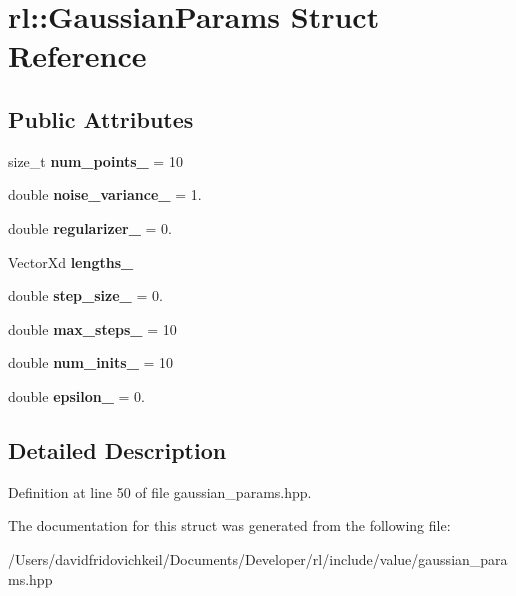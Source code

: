 \hypertarget{structrl_1_1_gaussian_params}{}\section{rl\+:\+:Gaussian\+Params Struct Reference}
\label{structrl_1_1_gaussian_params}
\subsection*{Public Attributes}
\begin{DoxyCompactItemize}
\item 
\hypertarget{structrl_1_1_gaussian_params_a76e6009e1a4541999ce182f81cec5c3f}{}\label{structrl_1_1_gaussian_params_a76e6009e1a4541999ce182f81cec5c3f} 
size\+\_\+t {\bfseries num\+\_\+points\+\_\+} = 10
\item 
\hypertarget{structrl_1_1_gaussian_params_af463006933f852898d53d96886379873}{}\label{structrl_1_1_gaussian_params_af463006933f852898d53d96886379873} 
double {\bfseries noise\+\_\+variance\+\_\+} = 1.
\item 
\hypertarget{structrl_1_1_gaussian_params_a6815c97c112e682e099f75cf800c0b7f}{}\label{structrl_1_1_gaussian_params_a6815c97c112e682e099f75cf800c0b7f} 
double {\bfseries regularizer\+\_\+} = 0.
\item 
\hypertarget{structrl_1_1_gaussian_params_a7940767f6527710ae24cf5b5a7126547}{}\label{structrl_1_1_gaussian_params_a7940767f6527710ae24cf5b5a7126547} 
Vector\+Xd {\bfseries lengths\+\_\+}
\item 
\hypertarget{structrl_1_1_gaussian_params_a4eb755f150de20187dc08b382d38e4a6}{}\label{structrl_1_1_gaussian_params_a4eb755f150de20187dc08b382d38e4a6} 
double {\bfseries step\+\_\+size\+\_\+} = 0.
\item 
\hypertarget{structrl_1_1_gaussian_params_a5132c101f5fc6bf991bdf9a70d6e9e21}{}\label{structrl_1_1_gaussian_params_a5132c101f5fc6bf991bdf9a70d6e9e21} 
double {\bfseries max\+\_\+steps\+\_\+} = 10
\item 
\hypertarget{structrl_1_1_gaussian_params_a0123c7529d18b1b158c4302617f93131}{}\label{structrl_1_1_gaussian_params_a0123c7529d18b1b158c4302617f93131} 
double {\bfseries num\+\_\+inits\+\_\+} = 10
\item 
\hypertarget{structrl_1_1_gaussian_params_a92dd99cec5fc13270e84b8e2e0285956}{}\label{structrl_1_1_gaussian_params_a92dd99cec5fc13270e84b8e2e0285956} 
double {\bfseries epsilon\+\_\+} = 0.
\end{DoxyCompactItemize}


\subsection{Detailed Description}


Definition at line 50 of file gaussian\+\_\+params.\+hpp.



The documentation for this struct was generated from the following file\+:\begin{DoxyCompactItemize}
\item 
/\+Users/davidfridovichkeil/\+Documents/\+Developer/rl/include/value/gaussian\+\_\+params.\+hpp\end{DoxyCompactItemize}
